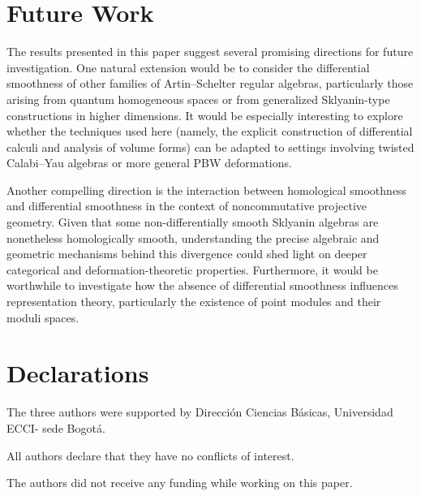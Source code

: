 \documentclass{amsart}
\theoremstyle{definition}
\theoremstyle{remark}
\numberwithin{equation}{section}
\begin{document}
\section{Future Work}

The results presented in this paper suggest several promising directions for future investigation. One natural extension would be to consider the differential smoothness of other families of Artin–Schelter regular algebras, particularly those arising from quantum homogeneous spaces or from generalized Sklyanin-type constructions in higher dimensions. It would be especially interesting to explore whether the techniques used here (namely, the explicit construction of differential calculi and analysis of volume forms) can be adapted to settings involving twisted Calabi–Yau algebras or more general PBW deformations.

Another compelling direction is the interaction between homological smoothness and differential smoothness in the context of noncommutative projective geometry. Given that some non-differentially smooth Sklyanin algebras are nonetheless homologically smooth, understanding the precise algebraic and geometric mechanisms behind this divergence could shed light on deeper categorical and deformation-theoretic properties. Furthermore, it would be worthwhile to investigate how the absence of differential smoothness influences representation theory, particularly the existence of point modules and their moduli spaces.

\section{Declarations}

The three authors were supported by Dirección Ciencias Básicas, Universidad ECCI- sede Bogotá.

All authors declare that they have no conflicts of interest.

The authors did not receive any funding while working on this paper.
\end{document}
